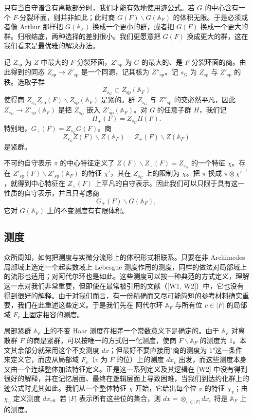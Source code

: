 只有当自守谱含有离散部分时，我们才能有效地使用迹公式。若 $G$ 的中心含有一个 $F$-分裂环面，则并非如此；此时商 $G(F)\backslash G(\mathbb A_F)$ 的体积无限。于是必须或者像 Arthur 那样把 $G(\mathbb A_F)$ 换成一个更小的群，或者把 $G(F)$ 换成一个更大的群。归根结底，两种选择的差别很小。我们更愿意把 $G(F)$ 换成更大的群，这在我们看来是最优雅的解决办法。

记 $Z_{\mathrm{sp}}$ 为 $Z$ 中最大的 $F$-分裂环面，$Z'_{\mathrm{sp}}$ 为 $G$ 的最大的、是 $F$-分裂环面的商。由此得到的同态 $Z_{\mathrm{sp}}\to Z'_{\mathrm{sp}}$ 是一个同源，记其核为 $Z''_{\mathrm{sp}}$。记 $s_G$ 为 $Z_{\mathrm{sp}}$ 与 $Z'_{\mathrm{sp}}$ 的秩。选取子群
\[
Z_{s_G}\subset Z_{\mathrm{sp}}(\mathbb A_F)
\]
使得商 $Z_{s_G}Z_{\mathrm{sp}}(F)\backslash Z_{\mathrm{sp}}(\mathbb A_F)$ 是紧的。群 $Z_{s_G}$ 与 $Z''_{\mathrm{sp}}$ 的交必然平凡，因此 $Z_{s_G}\to Z'_{\mathrm{sp}}(\mathbb A_F)$ 是把 $Z_{s_G}$ 嵌入 $Z'_{\mathrm{sp}}(\mathbb A_F)$。对 $G$ 的任意子群 $H$，我们记
\[
H_+(F)=Z_{s_G}H(F).
\]
特别地，$G_+(F)=Z_{s_G}G(F)$。商
\[
Z_{s_G}Z(F)\backslash Z(\mathbb A_F)=Z_+(F)\backslash Z(\mathbb A_F)
\]
是紧群。

不可约自守表示 $\pi$ 的中心特征定义了 $Z(F)\backslash Z_+(F)=Z_{s_G}$ 的一个特征 $\chi$。存在 $Z'_{\mathrm{sp}}(F)\backslash Z'_{\mathrm{sp}}(\mathbb A_F)$ 的特征 $\chi'$，其在 $Z_{s_G}$ 上的限制为 $\chi$。把 $\pi$ 换成 $\pi\otimes\chi'^{-1}$，就得到中心特征在 $Z_+(F)$ 上平凡的自守表示。因此我们可以只限于具有这一性质的自守表示，并且只考虑商
\[
G_+(F)\backslash G(\mathbb A_F),
\]
它对 $G(\mathbb A_F)$ 上的不变测度有有限体积。

\subsection{测度}

众所周知，如何把测度与实微分流形上的体积形式相联系。只要在非 Archimedes 局部域上选定一个起实数域上 Lebesgue 测度作用的测度，同样的做法对局部域上的流形也适用；对阿代尔环也是如此。这些测度可以按一种典范的方式定义，理解这一点对我们非常重要，但即使在最常被引用的文献（[W1, W2]）中，它也没有得到很好的解释。由于对我们而言，有一份精确而又尽可能简短的参考材料确实重要，我们在此重述这些定义。于是我们先在 阿代尔环 $\mathbb A_F$ 与所有位 $v\in|F|$ 的局部域 $F_v$ 上固定相容的测度。

局部紧群 $\mathbb A_F$ 上的不变 Haar 测度在相差一个常数意义下是确定的。由于 $\mathbb A_F$ 对离散群 $F$ 的商是紧群，可以按唯一的方式归一化测度，使商 $F\backslash\mathbb A_F$ 的测度为 $1$。本文其余部分就采用这个不变测度 $dx$；但最好不要直接用"商的测度为 $1$"这一条件来定义它，而应从局部域 $F_v$（$v$ 为 $F$ 的位）上的测度 $dx_v$ 出发，而这些测度本身又由一个连续整体加法特征定义。正是这一系列定义及其逻辑在 [W2] 中没有得到很好的解释，并在记忆层面、最终在逻辑层面上导致困难，当我们到达约化群上的迹公式时尤其如此。我们从一个整体特征 $\chi$ 开始，它给出每个位 $v$ 的特征 $\chi_v$；由 $\chi_v$ 定义测度 $dx_v$。若 $|F|$ 表示所有这些位的集合，则 $dx=\otimes_{v\in|F|}dx_v$ 将是 $\mathbb A_F$ 上的测度。

